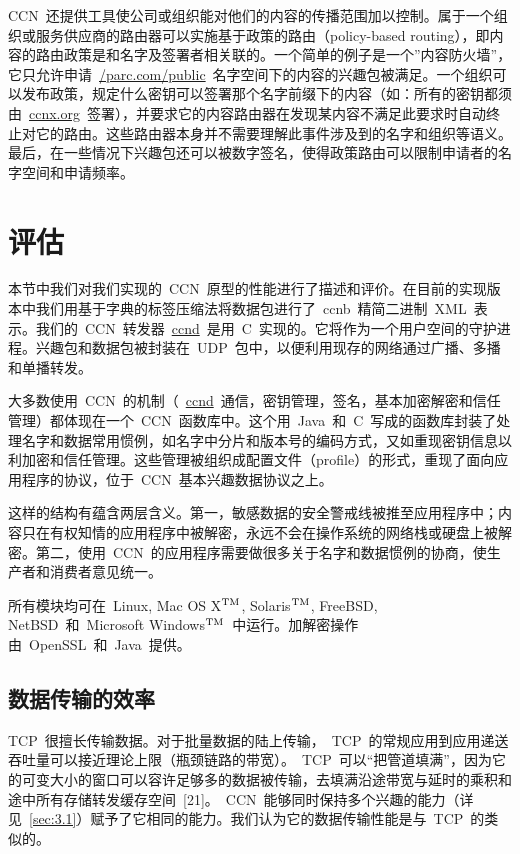 CCN~还提供工具使公司或组织能对他们的内容的传播范围加以控制。属于一个组织或服务供应商的路由器可以实施基于政策的路由（policy-based routing），即内容的路由政策是和名字及签署者相关联的。一个简单的例子是一个”内容防火墙”，它只允许申请~\url{/parc.com/public}~名字空间下的内容的兴趣包被满足。一个组织可以发布政策，规定什么密钥可以签署那个名字前缀下的内容（如：所有的密钥都须由~\url{ccnx.org}~签署），并要求它的内容路由器在发现某内容不满足此要求时自动终止对它的路由。这些路由器本身并不需要理解此事件涉及到的名字和组织等语义。最后，在一些情况下兴趣包还可以被数字签名，使得政策路由可以限制申请者的名字空间和申请频率。

\section{评估}
\label{sec:6}
本节中我们对我们实现的~CCN~原型的性能进行了描述和评价。在目前的实现版本中我们用基于字典的标签压缩法将数据包进行了~ccnb~精简二进制~XML~表示。我们的~CCN~转发器~\url{ccnd}~是用~C~实现的。它将作为一个用户空间的守护进程。兴趣包和数据包被封装在~UDP~包中，以便利用现存的网络通过广播、多播和单播转发。

大多数使用~CCN~的机制（~\url{ccnd}~通信，密钥管理，签名，基本加密解密和信任管理）都体现在一个~CCN~函数库中。这个用~Java~和~C~写成的函数库封装了处理名字和数据常用惯例，如名字中分片和版本号的编码方式，又如重现密钥信息以利加密和信任管理。这些管理被组织成配置文件（profile）的形式，重现了面向应用程序的协议，位于~CCN~基本兴趣数据协议之上。

这样的结构有蕴含两层含义。第一，敏感数据的安全警戒线被推至应用程序中；内容只在有权知情的应用程序中被解密，永远不会在操作系统的网络栈或硬盘上被解密。第二，使用~CCN~的应用程序需要做很多关于名字和数据惯例的协商，使生产者和消费者意见统一。

\def\tm{\leavevmode\hbox{$\rm {}^{TM}$}} %
所有模块均可在~Linux, Mac OS X\tm, Solaris\tm, FreeBSD, NetBSD~和~Microsoft Windows\tm~中运行。加解密操作由~OpenSSL~和~Java~提供。

\subsection{数据传输的效率}
\label{sec:6.1}
TCP~很擅长传输数据。对于批量数据的陆上传输，~TCP~的常规应用到应用递送吞吐量可以接近理论上限（瓶颈链路的带宽）。~TCP~可以“把管道填满”，因为它的可变大小的窗口可以容许足够多的数据被传输，去填满沿途带宽与延时的乘积和途中所有存储转发缓存空间~[21]。~CCN~能够同时保持多个兴趣的能力（详见~\ref{sec:3.1}）赋予了它相同的能力。我们认为它的数据传输性能是与~TCP~的类似的。


